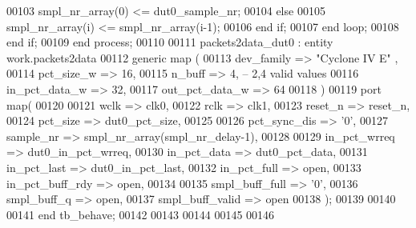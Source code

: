 \begin{DoxyCode}
00103                \textcolor{vhdlchar}{smpl_nr_array}\textcolor{vhdlchar}{(}\textcolor{vhdllogic}{}\textcolor{vhdllogic}{0}\textcolor{vhdlchar}{)} \textcolor{vhdlchar}{<=} \textcolor{vhdlchar}{dut0_sample_nr};
00104             \textcolor{keywordflow}{else} 
00105                \textcolor{vhdlchar}{smpl_nr_array}\textcolor{vhdlchar}{(}\textcolor{vhdlchar}{i}\textcolor{vhdlchar}{)} \textcolor{vhdlchar}{<=} \textcolor{vhdlchar}{smpl_nr_array}\textcolor{vhdlchar}{(}\textcolor{vhdlchar}{i}\textcolor{vhdlchar}{-}\textcolor{vhdllogic}{}\textcolor{vhdllogic}{1}\textcolor{vhdlchar}{)};
00106             \textcolor{keywordflow}{end} \textcolor{keywordflow}{if};
00107          \textcolor{keywordflow}{end} \textcolor{keywordflow}{loop};
00108       \textcolor{keywordflow}{end} \textcolor{keywordflow}{if};
00109    \textcolor{keywordflow}{end} \textcolor{keywordflow}{process};
00110   
00111   packets2data\_dut0 : \textcolor{keywordflow}{entity} work.packets2data
00112    \textcolor{keywordflow}{generic} \textcolor{keywordflow}{map} (
00113       dev_family        => \textcolor{keyword}{"Cyclone IV E"}  ,
00114       pct_size_w        =>  \textcolor{vhdllogic}{16},
00115       n_buff            =>  \textcolor{vhdllogic}{4},\textcolor{keyword}{ -- 2,4 valid values}
00116       in_pct_data_w     =>  \textcolor{vhdllogic}{32},
00117       out_pct_data_w    =>  \textcolor{vhdllogic}{64}
00118    \textcolor{vhdlchar}{)}
00119    \textcolor{keywordflow}{port} \textcolor{keywordflow}{map}(
00120 
00121       wclk              => clk0,
00122       rclk              => clk1, 
00123       reset_n           => reset_n,
00124       pct_size          => dut0_pct_size,
00125       
00126       pct_sync_dis      => '0',
00127       sample_nr         => smpl_nr_array\textcolor{vhdlchar}{(}smpl_nr_delay-\textcolor{vhdllogic}{1}\textcolor{vhdlchar}{)},
00128       
00129       in_pct_wrreq      => dut0_in_pct_wrreq,
00130       in_pct_data       => dut0_pct_data,
00131       in_pct_last       => dut0_in_pct_last,
00132       in_pct_full       => \textcolor{keywordflow}{open},
00133       in_pct_buff_rdy   => \textcolor{keywordflow}{open},
00134       
00135       smpl_buff_full    => '0',
00136       smpl_buff_q       => \textcolor{keywordflow}{open},    
00137       smpl_buff_valid   => \textcolor{keywordflow}{open}
00138         \textcolor{vhdlchar}{)};
00139       
00140     
00141     \textcolor{keywordflow}{end} \textcolor{vhdlchar}{tb\_behave};
00142   
00143   
00144 
00145 
00146   
\end{DoxyCode}
